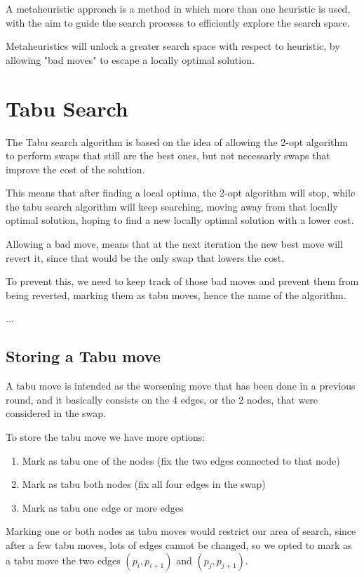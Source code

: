 A metaheuristic approach is a method in which more than one heuristic is used, with the aim to guide the search processs to efficiently explore the search space.

Metaheuristics will unlock a greater search space with respect to heuristic, by allowing "bad moves" to escape a locally optimal solution.

\section{Tabu Search}
The Tabu search algorithm is based on the idea of allowing the 2-opt algorithm to perform swaps that still are the best ones, but not necessarly swaps that improve the cost of the solution.

This means that after finding a local optima, the 2-opt algorithm will stop, while the tabu search algorithm will keep searching, moving away from that locally optimal solution, hoping to find a new locally optimal solution with a lower cost.

Allowing a bad move, means that at the next iteration the new best move will revert it, since that would be the only swap that lowers the cost.

To prevent this, we need to keep track of those bad moves and prevent them from being reverted, marking them as tabu moves, hence the name of the algorithm.

...
\subsection{Storing a Tabu move}

A tabu move is intended as the worsening move that has been done in a previous round, and it basically consists on the 4 edges, or the 2 nodes, that were considered in the swap.

To store the tabu move we have more options:

\begin{enumerate}
    \item Mark as tabu one of the nodes (fix the two edges connected to that node)
    \item Mark as tabu both nodes (fix all four edges in the swap)
    \item Mark as tabu one edge or more edges
\end{enumerate}

Marking one or both nodes as tabu moves would restrict our area of search, since after a few tabu moves, lots of edges cannot be changed, so we opted to mark as a tabu move the two edges $(p_{i},p_{i+1})$ and $(p_{j}, p_{j+1})$.

